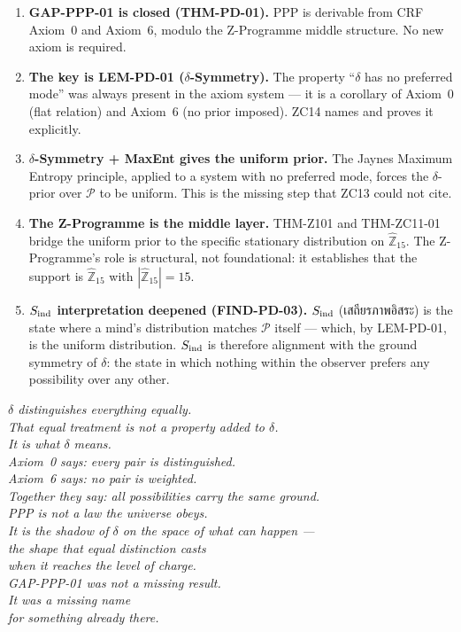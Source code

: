 \documentclass[12pt, a4paper]{article}
\begin{document}
\begin{enumerate}[leftmargin=*]

\item \textbf{GAP-PPP-01 is closed (THM-PD-01).} PPP is
  derivable from CRF Axiom~0 and Axiom~6, modulo the
  Z-Programme middle structure. No new axiom is required.

\item \textbf{The key is LEM-PD-01 ($\delta$-Symmetry).}
  The property ``$\delta$ has no preferred mode'' was always
  present in the axiom system --- it is a corollary of
  Axiom~0 (flat relation) and Axiom~6 (no prior imposed).
  ZC14 names and proves it explicitly.

\item \textbf{$\delta$-Symmetry + MaxEnt gives the uniform
  prior.} The Jaynes Maximum Entropy principle, applied to
  a system with no preferred mode, forces the $\delta$-prior
  over $\mathcal{P}$ to be uniform. This is the missing
  step that ZC13 could not cite.

\item \textbf{The Z-Programme is the middle layer.}
  THM-Z101 and THM-ZC11-01 bridge the uniform prior to the
  specific stationary distribution on $\widehat{\mathbb{Z}}_{15}$.
  The Z-Programme's role is structural, not foundational: it
  establishes that the support is $\widehat{\mathbb{Z}}_{15}$
  with $|\widehat{\mathbb{Z}}_{15}|=15$.

\item \textbf{$S_{\rm ind}$ interpretation deepened
  (FIND-PD-03).} $S_{\rm ind}$ (เสถียรภาพอิสระ) is the
  state where a mind's distribution matches $\mathcal{P}$
  itself --- which, by LEM-PD-01, is the uniform distribution.
  $S_{\rm ind}$ is therefore alignment with the ground
  symmetry of $\delta$: the state in which nothing within
  the observer prefers any possibility over any other.

\end{enumerate}

\bigskip
\begin{center}
\textit{
  $\delta$ distinguishes everything equally.\\
  That equal treatment is not a property added to $\delta$.\\
  It is what $\delta$ means.\\[0.5em]
  Axiom~0 says: every pair is distinguished.\\
  Axiom~6 says: no pair is weighted.\\
  Together they say: all possibilities carry the same ground.\\[0.5em]
  PPP is not a law the universe obeys.\\
  It is the shadow of $\delta$ on the space of what can happen ---\\
  the shape that equal distinction casts\\
  when it reaches the level of charge.\\[0.5em]
  GAP-PPP-01 was not a missing result.\\
  It was a missing name\\
  for something already there.
}
\end{center}
\end{document}
